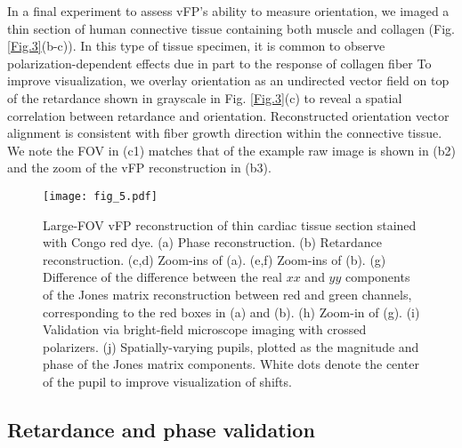 \documentclass{article}
\begin{document}
In a final experiment to assess vFP's ability to measure orientation, we imaged a thin section of human connective tissue containing both muscle and collagen (Fig. \ref{Fig.3}(b-c)). In this type of tissue specimen, it is common to observe polarization-dependent effects due in part to the response of collagen fiber\cite{tuchin2016polarized,yang2021instant} To improve visualization, we overlay orientation as an undirected vector field on top of the retardance shown in grayscale in Fig. \ref{Fig.3}(c) to reveal a spatial correlation between retardance and orientation. Reconstructed orientation vector alignment is consistent with fiber growth direction within the connective tissue. We note the FOV in (c1) matches that of the example raw image is shown in (b2) and the zoom of the vFP reconstruction in (b3).


\begin{figure*}[ht!]
\centering\texttt{[image: fig\_5.pdf]}
    \caption{Large-FOV vFP reconstruction of thin cardiac tissue section stained with Congo red dye. (a) Phase reconstruction. (b) Retardance reconstruction. (c,d) Zoom-ins of (a). (e,f) Zoom-ins of (b). (g) Difference of the difference between the real $xx$ and $yy$ components of the Jones matrix reconstruction between red and green channels, corresponding to the red boxes in (a) and (b). (h) Zoom-in of (g). (i) Validation via bright-field microscope imaging with crossed polarizers. (j) Spatially-varying pupils, plotted as the magnitude and phase of the Jones matrix components. White dots denote the center of the pupil to improve visualization of shifts.
    }
    \label{Fig.5}
\end{figure*}
\subsection{Retardance and phase validation}
\end{document}
